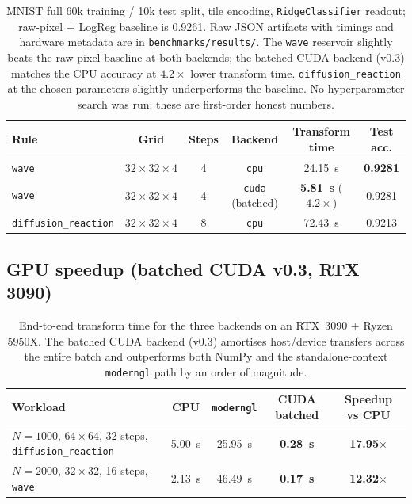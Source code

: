 \documentclass[11pt,a4paper]{article}
\begin{document}
\begin{table}[h]
\centering
\begin{tabular}{lccccc}
\toprule
Rule                  & Grid          & Steps & Backend & Transform time & Test acc. \\
\midrule
\texttt{wave}              & $32{\times}32{\times}4$ & 4 & \texttt{cpu}            & 24.15~s             & \textbf{0.9281} \\
\texttt{wave}              & $32{\times}32{\times}4$ & 4 & \texttt{cuda} (batched) & \textbf{5.81~s} ($4.2\times$) & 0.9281 \\
\texttt{diffusion\_reaction} & $32{\times}32{\times}4$ & 8 & \texttt{cpu}          & 72.43~s             & 0.9213 \\
\bottomrule
\end{tabular}
\caption{MNIST full 60k training / 10k test split, tile encoding,
\texttt{RidgeClassifier} readout; raw-pixel $+$ LogReg baseline is 0.9261. Raw
JSON artifacts with timings and hardware metadata are in
\texttt{benchmarks/results/}. The \texttt{wave} reservoir slightly beats the
raw-pixel baseline at both backends; the batched CUDA backend (v0.3) matches
the CPU accuracy at $4.2\times$ lower transform time.
\texttt{diffusion\_reaction} at the chosen parameters slightly underperforms the
baseline. No hyperparameter search was run: these are first-order honest
numbers.}
\label{tab:mnist60k}
\end{table}

\subsection{GPU speedup (batched CUDA v0.3, RTX 3090)}

\begin{table}[h]
\centering
\begin{tabular}{lcccc}
\toprule
Workload & CPU & \texttt{moderngl} & CUDA batched & Speedup vs CPU \\
\midrule
$N{=}1000$, $64{\times}64$, 32 steps, \texttt{diffusion\_reaction} & 5.00~s & 25.95~s & \textbf{0.28~s} & \textbf{17.95$\times$} \\
$N{=}2000$, $32{\times}32$, 16 steps, \texttt{wave}                & 2.13~s & 46.49~s & \textbf{0.17~s} & \textbf{12.32$\times$} \\
\bottomrule
\end{tabular}
\caption{End-to-end transform time for the three backends on an RTX~3090 +
Ryzen 5950X. The batched CUDA backend (v0.3) amortises host/device transfers
across the entire batch and outperforms both NumPy and the
standalone-context \texttt{moderngl} path by an order of magnitude.}
\label{tab:gpuspeedup}
\end{table}
\end{document}
